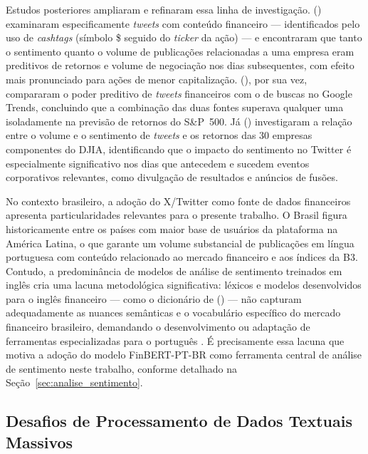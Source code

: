 Estudos posteriores ampliaram e refinaram essa linha de investigação. \citeauthor{sprenger2014} (\citeyear{sprenger2014}) examinaram especificamente \textit{tweets} com conteúdo financeiro --- identificados pelo uso de \textit{cashtags} (símbolo \$ seguido do \textit{ticker} da ação) --- e encontraram que tanto o sentimento quanto o volume de publicações relacionadas a uma empresa eram preditivos de retornos e volume de negociação nos dias subsequentes, com efeito mais pronunciado para ações de menor capitalização. \citeauthor{mao2011} (\citeyear{mao2011}), por sua vez, compararam o poder preditivo de \textit{tweets} financeiros com o de buscas no Google Trends, concluindo que a combinação das duas fontes superava qualquer uma isoladamente na previsão de retornos do S\&P~500. Já \citeauthor{ranco2015} (\citeyear{ranco2015}) investigaram a relação entre o volume e o sentimento de \textit{tweets} e os retornos das 30 empresas componentes do DJIA, identificando que o impacto do sentimento no Twitter é especialmente significativo nos dias que antecedem e sucedem eventos corporativos relevantes, como divulgação de resultados e anúncios de fusões.

No contexto brasileiro, a adoção do X/Twitter como fonte de dados financeiros apresenta particularidades relevantes para o presente trabalho. O Brasil figura historicamente entre os países com maior base de usuários da plataforma na América Latina, o que garante um volume substancial de publicações em língua portuguesa com conteúdo relacionado ao mercado financeiro e aos índices da B3. Contudo, a predominância de modelos de análise de sentimento treinados em inglês cria uma lacuna metodológica significativa: léxicos e modelos desenvolvidos para o inglês financeiro --- como o dicionário de \citeauthor{loughran2011} (\citeyear{loughran2011}) --- não capturam adequadamente as nuances semânticas e o vocabulário específico do mercado financeiro brasileiro, demandando o desenvolvimento ou adaptação de ferramentas especializadas para o português \cite{santos2023finbert}. É precisamente essa lacuna que motiva a adoção do modelo FinBERT-PT-BR como ferramenta central de análise de sentimento neste trabalho, conforme detalhado na Seção~\ref{sec:analise_sentimento}.



\subsection{Desafios de Processamento de Dados Textuais Massivos}
\label{subsec:desafios_textuais}

